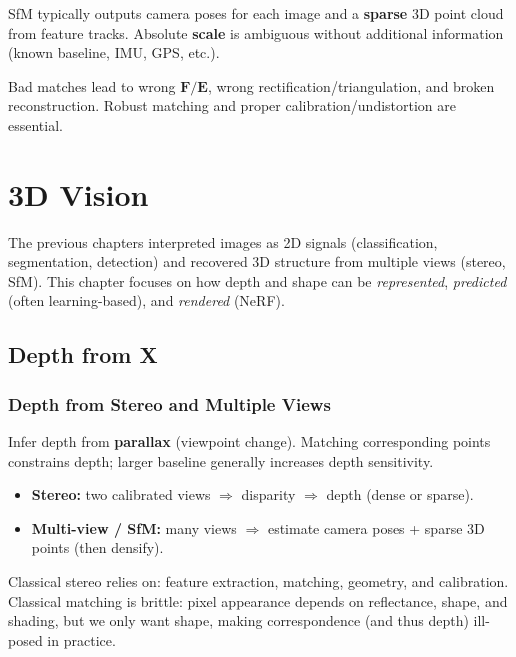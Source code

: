 \documentclass[11pt, oneside]{book}
\newcommand{\mat}[1]{\mathbf{#1}}       %
\begin{document}
SfM typically outputs camera poses for each image and a \textbf{sparse} 3D point cloud from feature tracks.
Absolute \textbf{scale} is ambiguous without additional information (known baseline, IMU, GPS, etc.).

Bad matches lead to wrong $\mat{F}/\mat{E}$, wrong rectification/triangulation, and broken reconstruction.
Robust matching and proper calibration/undistortion are essential.


\chapter{3D Vision}

The previous chapters interpreted images as 2D signals (classification, segmentation, detection) and
recovered 3D structure from multiple views (stereo, SfM). This chapter focuses on how depth and shape
can be \emph{represented}, \emph{predicted} (often learning-based), and \emph{rendered} (NeRF).

\section{Depth from X}

\subsection{Depth from Stereo and Multiple Views}

\begin{defbox}[title={Depth from Stereo}]
Infer depth from \textbf{parallax} (viewpoint change). Matching corresponding points constrains depth;
larger baseline generally increases depth sensitivity.
\begin{itemize}
  \item \textbf{Stereo:} two calibrated views $\Rightarrow$ disparity $\Rightarrow$ depth (dense or sparse).
  \item \textbf{Multi-view / SfM:} many views $\Rightarrow$ estimate camera poses + sparse 3D points (then densify).
\end{itemize}
\end{defbox}

Classical stereo relies on: feature extraction, matching, geometry, and calibration.
Classical matching is brittle: pixel appearance depends on reflectance, shape, and shading,
but we only want shape, making correspondence (and thus depth) ill-posed in practice.
\end{document}
